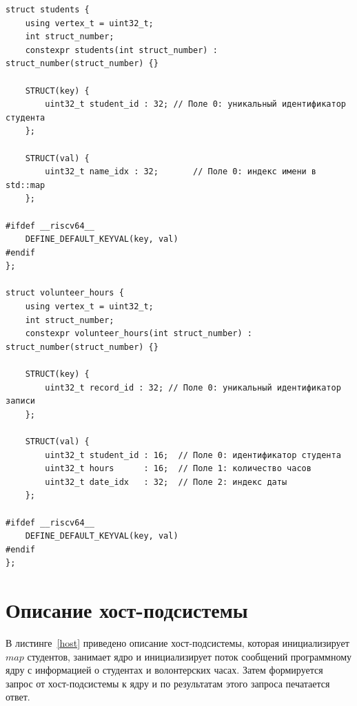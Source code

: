 \documentclass{article}
\begin{document}
\begin{lstlisting}[style=lang, label=structs, caption=Описание  структур]
struct students {
    using vertex_t = uint32_t;
    int struct_number;
    constexpr students(int struct_number) : struct_number(struct_number) {}

    STRUCT(key) {
        uint32_t student_id : 32; // Поле 0: уникальный идентификатор студента
    };

    STRUCT(val) {
        uint32_t name_idx : 32;       // Поле 0: индекс имени в std::map
    };

#ifdef __riscv64__
    DEFINE_DEFAULT_KEYVAL(key, val)
#endif
};

struct volunteer_hours {
    using vertex_t = uint32_t;
    int struct_number;
    constexpr volunteer_hours(int struct_number) : struct_number(struct_number) {}

    STRUCT(key) {
        uint32_t record_id : 32; // Поле 0: уникальный идентификатор записи
    };

    STRUCT(val) {
        uint32_t student_id : 16;  // Поле 0: идентификатор студента
        uint32_t hours      : 16;  // Поле 1: количество часов
        uint32_t date_idx   : 32;  // Поле 2: индекс даты
    };

#ifdef __riscv64__
    DEFINE_DEFAULT_KEYVAL(key, val)
#endif
};
\end{lstlisting}

\clearpage\section{Описание хост-подсистемы}

В листинге~\ref{host} приведено описание хост-подсистемы, которая инициализирует $map$ студентов, занимает ядро и 
инициализирует поток сообщений программному ядру с информацией о студентах и волонтерских часах. Затем формируется
запрос от хост-подсистемы к ядру и по результатам этого запроса печатается ответ.
\end{document}
